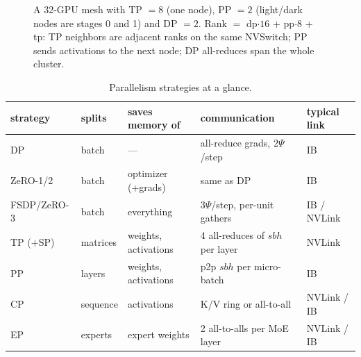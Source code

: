 \begin{figure}[t]
\centering
{}
\caption{A 32-GPU mesh with TP $=8$ (one node), PP $=2$ (light/dark nodes are stages 0 and 1)
and DP $=2$. Rank $=$ dp$\cdot16$ + pp$\cdot8$ + tp: TP neighbors are adjacent ranks on the same
NVSwitch; PP sends activations to the next node; DP all-reduces span the whole cluster.}
\label{fig:dist:mesh}
\end{figure}

\begin{table}[t]
\centering\footnotesize
\begin{tabularx}{\linewidth}{lXXXl}
\toprule
strategy & splits & saves memory of & communication & typical link \\
\midrule
DP & batch & --- & all-reduce grads, $2\Psi$/step & IB \\
ZeRO-1/2 & batch & optimizer (+grads) & same as DP & IB \\
FSDP/ZeRO-3 & batch & everything & $3\Psi$/step, per-unit gathers & IB / NVLink \\
TP (+SP) & matrices & weights, activations & 4 all-reduces of $sbh$ per layer & NVLink \\
PP & layers & weights, activations & p2p $sbh$ per micro-batch & IB \\
CP & sequence & activations & K/V ring or all-to-all & NVLink / IB \\
EP & experts & expert weights & 2 all-to-alls per MoE layer & NVLink / IB \\
\bottomrule
\end{tabularx}
\caption{Parallelism strategies at a glance.}
\label{tab:dist:summary}
\end{table}

